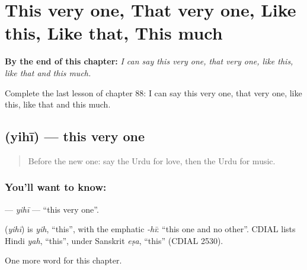
\chapter{This very one, That very one, Like this, Like that, This much}
\label{ch:ur-this-very-one-that-very-one-like-this-like-that-this-much}

\begin{chapteropening}
\textbf{By the end of this chapter:} \emph{I can say this very one, that very one, like this, like that and this much.}

Complete the last lesson of chapter 88: I can say this very one, that very one, like this, like that and this much.
\end{chapteropening}

\section[\texorpdfstring{\ur{یہی} (yihī)}{یہی (yihī)}]{ (yihī) — this very one}

\label{lesson:UR-C88-yihi}



\begin{quote}
Before the new one: say the Urdu for love, then the Urdu for music.
\end{quote}

\subsection*{You'll want to know: }
\textbf{} — \emph{yihī} — \textquotedblleft{}this very one\textquotedblright{}.

\begin{cousinweb}
\textbf{} (\emph{yihī}) is \emph{yih}, \textquotedblleft{}this\textquotedblright{}, with the emphatic \emph{-hī}: \textquotedblleft{}this one and no other\textquotedblright{}. CDIAL lists Hindi \emph{yah}, \textquotedblleft{}this\textquotedblright{}, under Sanskrit \emph{eṣa}, \textquotedblleft{}this\textquotedblright{} (CDIAL 2530).
\end{cousinweb}

\begin{grammarlens}[title={What you've built}]
One more word for this chapter.
\end{grammarlens}

